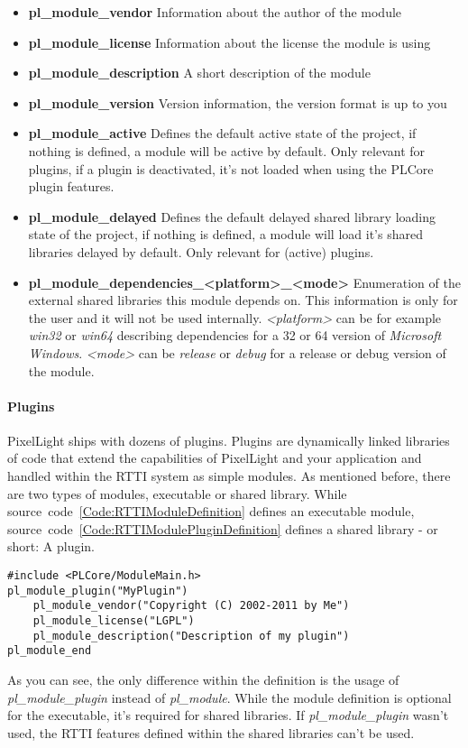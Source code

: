 \begin{itemize}
\item \textbf{pl\_module\_vendor} Information about the author of the module
\item \textbf{pl\_module\_license} Information about the license the module is using
\item \textbf{pl\_module\_description} A short description of the module
\item \textbf{pl\_module\_version} Version information, the version format is up to you
\item \textbf{pl\_module\_active} Defines the default active state of the project, if nothing is defined, a module will be active by default. Only relevant for plugins, if a plugin is deactivated, it's not loaded when using the PLCore plugin features.
\item \textbf{pl\_module\_delayed} Defines the default delayed shared library loading state of the project, if nothing is defined, a module will load it's shared libraries delayed by default. Only relevant for (active) plugins.
\item \textbf{pl\_module\_dependencies\_\textless platform\textgreater\_\textless mode\textgreater} Enumeration of the external shared libraries this module depends on. This information is only for the user and it will not be used internally. \emph{\textless platform\textgreater} can be for example \emph{win32} or \emph{win64} describing dependencies for a \SI{32}{\bit} or \SI{64}{\bit} version of \emph{Microsoft Windows}. \emph{\textless mode\textgreater} can be \emph{release} or \emph{debug} for a release or debug version of the module.
\end{itemize}


\paragraph{Plugins}
PixelLight ships with dozens of plugins. Plugins are dynamically linked libraries of code that extend the capabilities of PixelLight and your application and handled within the RTTI system as simple modules. As mentioned before, there are two types of modules, executable or shared library. While source~code~\ref{Code:RTTIModuleDefinition} defines an executable module, source~code~\ref{Code:RTTIModulePluginDefinition} defines a shared library - or short: A plugin.
\begin{lstlisting}[float=htb,label=Code:RTTIModulePluginDefinition,caption={Defining a new RTTI module plugin}]
#include <PLCore/ModuleMain.h>
pl_module_plugin("MyPlugin")
	pl_module_vendor("Copyright (C) 2002-2011 by Me")
	pl_module_license("LGPL")
	pl_module_description("Description of my plugin")
pl_module_end
\end{lstlisting}
As you can see, the only difference within the definition is the usage of \emph{pl\_module\_plugin} instead of \emph{pl\_module}. While the module definition is optional for the executable, it's required for shared libraries. If \emph{pl\_module\_plugin} wasn't used, the RTTI features defined within the shared libraries can't be used.

